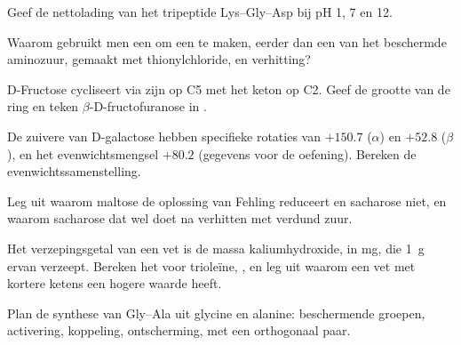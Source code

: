 \begin{exercise}[$\star\star$]\label{exo:b2:biomolecules:5}
Geef de nettolading van het tripeptide Lys--Gly--Asp bij pH 1, 7 en 12.
\end{exercise}

\begin{exercise}[$\star\star$]\label{exo:b2:biomolecules:6}
Waarom gebruikt men een  om een  te maken, eerder dan een  van het beschermde
aminozuur, gemaakt met thionylchloride, en verhitting?
\end{exercise}

\begin{exercise}[$\star\star$]\label{exo:b2:biomolecules:7}
D-Fructose cycliseert via zijn  op C5 met het keton op C2. Geef de grootte van de ring en teken
$\beta$-D-fructofuranose in .
\end{exercise}

\begin{exercise}[$\star\star$]\label{exo:b2:biomolecules:8}
De zuivere  van D-galactose hebben specifieke rotaties van $+150.7$ ($\alpha$) en $+52.8$ ($\beta$), en
het evenwichtsmengsel $+80.2$ (gegevens voor de oefening). Bereken de evenwichtssamenstelling.
\end{exercise}

\begin{exercise}[$\star\star$]\label{exo:b2:biomolecules:9}
Leg uit waarom maltose de oplossing van Fehling reduceert en sacharose niet, en waarom sacharose dat wel doet na
verhitten met verdund zuur.
\end{exercise}

\begin{exercise}[$\star\star\star$]\label{exo:b2:biomolecules:10}
Het verzepingsgetal van een vet is de massa kaliumhydroxide, in mg, die 1~g ervan verzeept.
Bereken het voor trioleïne, , en leg uit waarom een vet met kortere ketens een hogere waarde heeft.
\end{exercise}

\begin{exercise}[$\star\star\star$]\label{exo:b2:biomolecules:11}
Plan de synthese van Gly--Ala uit glycine en alanine: beschermende groepen, activering, koppeling,
ontscherming, met een orthogonaal paar.
\end{exercise}

